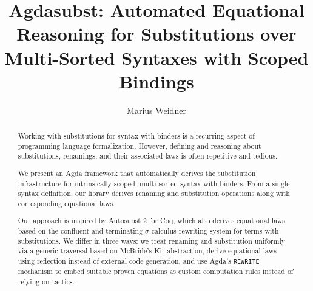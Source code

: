\documentclass[screen,nonacm]{acmart}
\begin{document}
\title{Agdasubst: Automated Equational Reasoning for Substitutions over Multi-Sorted Syntaxes with Scoped Bindings}

\author{Marius Weidner}

\begin{abstract}

  Working with substitutions for syntax with binders is a recurring aspect of
  programming language formalization. However, defining and reasoning about
  substitutions, renamings, and their associated laws is often repetitive and
  tedious.

  We present an Agda framework that automatically derives the substitution
  infrastructure for intrinsically scoped, multi-sorted syntax with binders. From
  a single syntax definition, our library derives renaming and substitution
  operations along with corresponding equational laws.

  Our approach is inspired by Autosubst 2 for Coq, which also derives equational
  laws based on the confluent and terminating \(\sigma\)-calculus rewriting
  system for terms with substitutions. We differ in three ways: we treat renaming
  and substitution uniformly via a generic traversal based on McBride’s Kit
  abstraction, derive equational laws using reflection instead of external code
  generation, and use Agda’s \texttt{REWRITE} mechanism to embed suitable proven
  equations as custom computation rules instead of relying on tactics.
\end{abstract}
\end{document}
